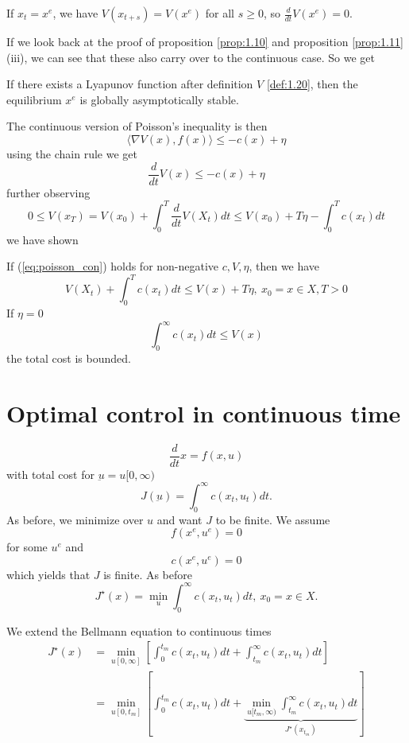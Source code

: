 If \(x_t=x^e\), we have \(V(x_{t+s})=V(x^e)\) for all \(s\geq 0\), so 
\(\frac{d}{dt}V(x^e)=0\).

If we look back at the proof of proposition \ref{prop:1.10} and proposition \ref{prop:1.11} (iii),
we can see that these also carry over to the continuous case. So we get 
\begin{proposition}\label{prop:1.21}
    If there exists a Lyapunov function after definition \(V\) \ref{def:1.20},
    then the equilibrium \(x^e\) is globally asymptotically stable.  
\end{proposition}  

The continuous version of Poisson's inequality is then 
\begin{equation}\label{eq:poisson_con}
    \langle \nabla V(x),f(x) \rangle \leq -c(x)+\eta
\end{equation}
using the chain rule we get 
\[\frac{d}{dt} V(x)\leq -c(x)+\eta \]
further observing \[0\leq V(x_T)=V(x_0)+\int_0^T \frac{d}{dt}V(X_t)dt\leq V(x_0)+T\eta-\int_0^T c(x_t)dt\]
we have shown
\begin{proposition}\label{prop:1.22}
    If (\ref{eq:poisson_con}) holds for non-negative \(c,V,\eta\), then we have 
    \begin{equation}\label{eq:comp_thm_cont}
        V(X_t)+\int_0^Tc(x_t)dt\leq V(x)+T\eta, \ x_0=x\in X,T>0 
    \end{equation}
    If \(\eta=0\)
    \[\int_0^\infty c(x_t)dt\leq V(x)\]
    the total cost is bounded.
\end{proposition}

\section{Optimal control in continuous time} 

\[\frac{d}{dt}x=f(x,u)\]
with total cost for \(\underbar{u}=u[0,\infty)\)
\[J(\underbar{u})=\int_0^\infty c(x_t,u_t)dt.\]
As before, we minimize over \(u\) and want \(J\) to be finite.
We assume \[f(x^e,u^e)=0\] for some \(u^e\) and 
\[c(x^e,u^e)=0\]
which yields that \(J\) is finite. As before 
\[J^\star(x)=\min_u \int_0^\infty c(x_t,u_t)dt,\ x_0=x\in X.\]

We extend the Bellmann equation to continuous times 
\begin{align*}
    J^\star(x)&=\min_{u[0,\infty]}\left[\int_0^{t_m} c(x_t,u_t)dt+\int_{t_m}^\infty c(x_t,u_t)dt\right]\\ %
    &= \min_{u[0,t_m]}\left[\int_0^{t_m} c(x_t,u_t)dt+\underbrace{\min_{u[t_m,\infty)}\int_{t_m}^\infty c(x_t,u_t)dt}_{J^\star(x_{t_m})}\right]
\end{align*}

